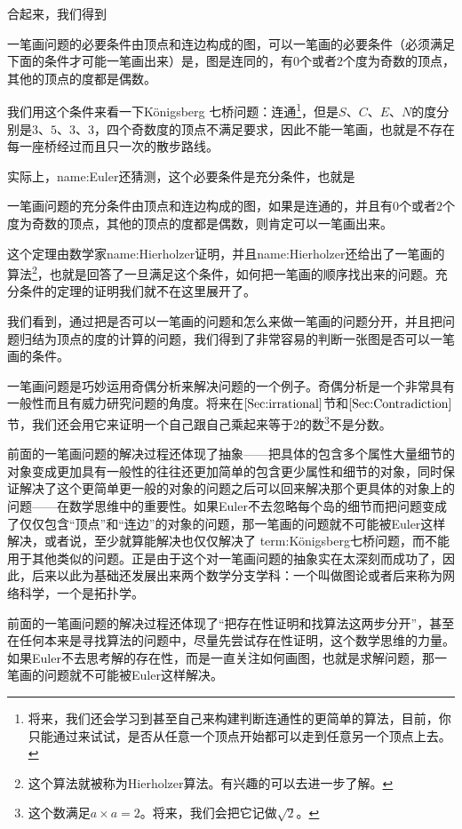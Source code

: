 \documentclass{ctexbook}
\newcommand{\SecRef}[1]{$\ref{#1}$节}
\begin{document}
合起来，我们得到
\begin{Theorem}
{一笔画问题的必要条件}{}由顶点和连边构成的图，可以一笔画的必要条件（必须满足下面的条件才可能一笔画出来）是，图是连同的，有$0$个或者$2$个度为奇数的顶点，其他的顶点的度都是偶数。
\end{Theorem}
我们用这个条件来看一下Königsberg 七桥问题：连通\footnote{将来，我们还会学习到甚至自己来构建判断连通性的更简单的算法，目前，你只能通过来试试，是否从任意一个顶点开始都可以走到任意另一个顶点上去。}，但是$S、C、E、N$的度分别是$3$、$5$、$3$、$3$，四个奇数度的顶点不满足要求，因此不能一笔画，也就是不存在每一座桥经过而且只一次的散步路线。

实际上，\gls{name:Euler}还猜测，这个必要条件是充分条件，也就是
\begin{Theorem}
{一笔画问题的充分条件}{}由顶点和连边构成的图，如果是连通的，并且有$0$个或者$2$个度为奇数的顶点，其他的顶点的度都是偶数，则肯定可以一笔画出来。
\end{Theorem}
这个定理由数学家\gls{name:Hierholzer}证明，并且\gls{name:Hierholzer}还给出了一笔画的算法\footnote{这个算法就被称为Hierholzer算法。有兴趣的可以去进一步了解。}，也就是回答了一旦满足这个条件，如何把一笔画的顺序找出来的问题。充分条件的定理的证明我们就不在这里展开了。

我们看到，通过把是否可以一笔画的问题和怎么来做一笔画的问题分开，并且把问题归结为顶点的度的计算的问题，我们得到了非常容易的判断一张图是否可以一笔画的条件。

一笔画问题是巧妙运用奇偶分析来解决问题的一个例子。奇偶分析是一个非常具有一般性而且有威力研究问题的角度。将来在\SecRef{Sec:irrational}和\SecRef{Sec:Contradiction}，我们还会用它来证明一个自己跟自己乘起来等于$2$的数\footnote{这个数满足$a\times a =2$。将来，我们会把它记做$\sqrt{2}$。}不是分数。

前面的一笔画问题的解决过程还体现了抽象——把具体的包含多个属性大量细节的对象变成更加具有一般性的往往还更加简单的包含更少属性和细节的对象，同时保证解决了这个更简单更一般的对象的问题之后可以回来解决那个更具体的对象上的问题——在数学思维中的重要性。如果Euler不去忽略每个岛的细节而把问题变成了仅仅包含“顶点”和“连边”的对象的问题，那一笔画的问题就不可能被Euler这样解决，或者说，至少就算能解决也仅仅解决了 \gls{term:Königsberg七桥问题}，而不能用于其他类似的问题。正是由于这个对一笔画问题的抽象实在太深刻而成功了，因此，后来以此为基础还发展出来两个数学分支学科：一个叫做图论或者后来称为网络科学，一个是拓扑学。

前面的一笔画问题的解决过程还体现了“把存在性证明和找算法这两步分开”，甚至在任何本来是寻找算法的问题中，尽量先尝试存在性证明，这个数学思维的力量。如果Euler不去思考解的存在性，而是一直关注如何画图，也就是求解问题，那一笔画的问题就不可能被Euler这样解决。
\end{document}

